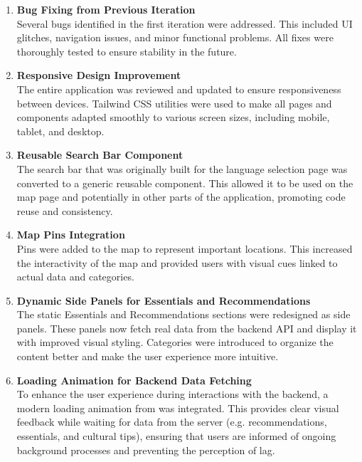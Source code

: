 \begin{enumerate}
    \item \textbf{Bug Fixing from Previous Iteration} \\
    Several bugs identified in the first iteration were addressed. This included UI glitches, navigation issues, and minor functional problems. All fixes were thoroughly tested to ensure stability in the future.
    \item \textbf{Responsive Design Improvement} \\
    The entire application was reviewed and updated to ensure responsiveness between devices. Tailwind CSS utilities were used to make all pages and components adapted smoothly to various screen sizes, including mobile, tablet, and desktop.
    \item \textbf{Reusable Search Bar Component} \\
    The search bar that was originally built for the language selection page was converted to a generic reusable component. This allowed it to be used on the map page and potentially in other parts of the application, promoting code reuse and consistency.
    \item \textbf{Map Pins Integration} \\
    Pins were added to the map to represent important locations. This increased the interactivity of the map and provided users with visual cues linked to actual data and categories.
    \item \textbf{Dynamic Side Panels for Essentials and Recommendations} \\
    The static Essentials and Recommendations sections were redesigned as side panels. These panels now fetch real data from the backend API and display it with improved visual styling. Categories were introduced to organize the content better and make the user experience more intuitive.
    \item \textbf{Loading Animation for Backend Data Fetching} \\
    To enhance the user experience during interactions with the backend, a modern loading animation from \cite{uiverse-loader} was integrated. This provides clear visual feedback while waiting for data from the server (e.g. recommendations, essentials, and cultural tips), ensuring that users are informed of ongoing background processes and preventing the perception of lag.


\end{enumerate}
